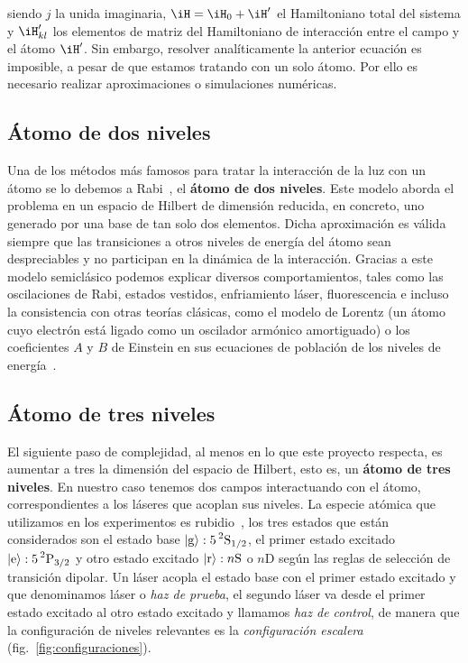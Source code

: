 siendo $j$ la unida imaginaria,  $\iH=\iH_\sm{0}+\iH'$ el Hamiltoniano total del sistema y $\iH'_{kl}$ los elementos de matriz del Hamiltoniano de interacción entre el campo y el átomo $\iH'$. Sin embargo, resolver analíticamente la anterior ecuación es imposible, a pesar de que estamos tratando con un solo átomo. Por ello es necesario realizar aproximaciones o simulaciones numéricas.

\subsection{\label{sub:atomo2Niveles}Átomo de dos niveles}

\p Una de los métodos más famosos para tratar la interacción de la luz con un átomo se lo debemos a Rabi~\cite{rabi}, el \textbf{átomo de dos niveles}. Este modelo aborda el problema en un espacio de Hilbert de dimensión reducida, en concreto, uno generado por una base de tan solo dos elementos. Dicha aproximación es válida siempre que las transiciones a otros niveles de energía del átomo sean despreciables y no participan en la dinámica de la interacción. Gracias a este modelo semiclásico podemos explicar diversos comportamientos, tales como las oscilaciones de Rabi, estados vestidos, enfriamiento láser, fluorescencia e incluso la consistencia con otras teorías clásicas, como el modelo de Lorentz (un átomo cuyo electrón está ligado como un oscilador armónico amortiguado) o los coeficientes $A$ y $B$ de Einstein en sus ecuaciones de población de los niveles de energía~\cite{steck2}.

\subsection{\label{sub:atomo3Niveles}Átomo de tres niveles}

\p El siguiente paso de complejidad, al menos en lo que este proyecto respecta, es aumentar a tres la dimensión del espacio de Hilbert, esto es, un \textbf{átomo de tres niveles}. En nuestro caso tenemos dos campos interactuando con el átomo, correspondientes a los láseres que acoplan sus niveles. La especie atómica que utilizamos en los experimentos es rubidio~\cite{rb85,rb87}, los tres estados que están considerados son el estado base $\ket{g}:5\prescript{2}{}{\mathrm{S}}_\sm{1/2}$, el primer estado excitado $\ket{e}:5\prescript{2}{}{\mathrm{P}}_\sm{3/2}$ y otro estado excitado $\ket{r}:n\mathrm{S}$ o $n\mathrm{D}$ según las reglas de selección de transición dipolar. Un láser acopla el estado base con el primer estado excitado y que denominamos láser o \emph{haz de prueba}, el segundo láser va desde el primer estado excitado al otro estado excitado y llamamos \emph{haz de control}, de manera que la configuración de niveles relevantes es la \emph{configuración escalera} (fig.~\ref{fig:configuraciones}). 

